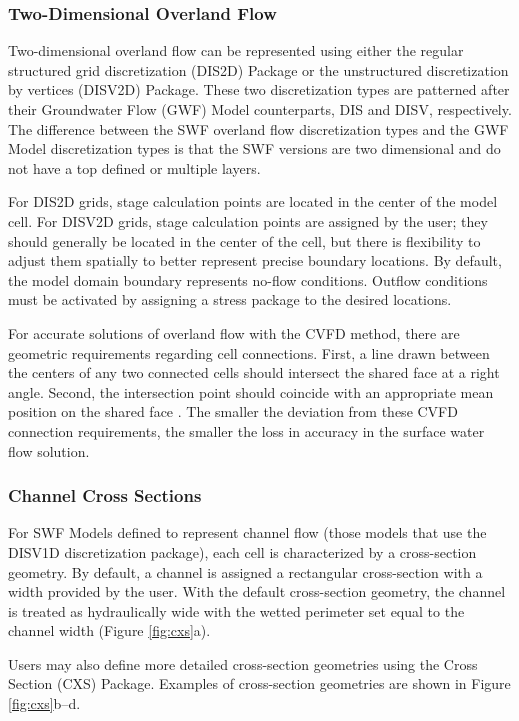 \documentclass[fleqn]{article}
\begin{document}
\subsubsection{Two-Dimensional Overland Flow}
Two-dimensional overland flow can be represented using either the regular structured grid discretization (DIS2D) Package or the unstructured discretization by vertices (DISV2D) Package.  These two discretization types are patterned after their Groundwater Flow (GWF) Model counterparts, DIS and DISV, respectively.  The difference between the SWF overland flow discretization types and the GWF Model discretization types is that the SWF versions are two dimensional and do not have a top defined or multiple layers.

For DIS2D grids, stage calculation points are located in the center of the model cell.  For DISV2D grids, stage calculation points are assigned by the user; they should generally be located in the center of the cell, but there is flexibility to adjust them spatially to better represent precise boundary locations.  By default, the model domain boundary represents no-flow conditions.  Outflow conditions must be activated by assigning a stress package to the desired locations.

For accurate solutions of overland flow with the CVFD method, there are geometric requirements regarding cell connections.  First, a line drawn between the centers of any two connected cells should intersect the shared face at a right angle. Second, the intersection point should coincide with an appropriate mean position on the shared face \cite{narasimhan1976integrated}.  The smaller the deviation from these CVFD connection requirements, the smaller the loss in accuracy in the surface water flow solution. 

\subsubsection{Channel Cross Sections}

For SWF Models defined to represent channel flow (those models that use the DISV1D discretization package), each cell is characterized by a cross-section geometry.  By default, a channel is assigned a rectangular cross-section with a width provided by the user.  With the default cross-section geometry, the channel is treated as hydraulically wide with the wetted perimeter set equal to the channel width (Figure \ref{fig:cxs}a).

Users may also define more detailed cross-section geometries using the Cross Section (CXS) Package.  Examples of cross-section geometries are shown in Figure \ref{fig:cxs}b--d.
\end{document}
